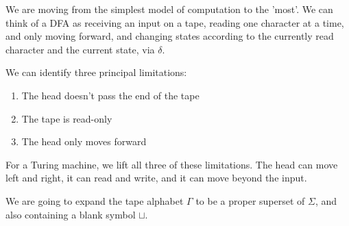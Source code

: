 \documentclass[twoside]{article}
\begin{document}
We are moving from the simplest model of computation to the 'most'.  We can think of a DFA as receiving an input on a tape, reading one character at a time, and only moving forward, and changing states according to the currently read character and the current state, via $\delta$.

We can identify three principal limitations:

\begin{enumerate}
	\item The head doesn't pass the end of the tape
	\item The tape is read-only
	\item The head only moves forward
\end{enumerate}


For a Turing machine, we lift all three of these limitations.  The head can move left and right, it can read and write, and it can move beyond the input.

We are going to expand the tape alphabet $\Gamma$ to be a proper superset of $\Sigma$, and also containing a blank symbol $\sqcup$.

\end{document}
